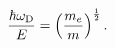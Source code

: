 \begin{equation}
\frac{\hbar\omega_{\rm D}}{E}=\left(\frac{m_e}{m}\right)^{\frac{1}{2}}.
\label{ratio}
\end{equation}

